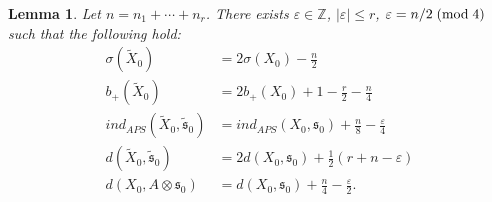 \documentclass{amsart}
\newtheorem{lemma}[theorem]{Lemma}
\theoremstyle{definition}
\theoremstyle{remark}
\numberwithin{equation}{section}
\begin{document}
\begin{lemma}\label{lem:rpcov}
Let $n = n_1 + \cdots + n_r$. There exists $\varepsilon \in \mathbb{Z}$, $| \varepsilon | \le r$, $\varepsilon = n/2 \; ({\rm mod} \; 4)$ such that the following hold:
\begin{align*}
\sigma(\widetilde{X}_0) &= 2 \sigma(X_0) - \frac{n}{2} \\
b_+(\widetilde{X}_0) &= 2b_+(X_0) + 1 -\frac{r}{2} - \frac{n}{4} \\
ind_{APS}(\widetilde{X}_0 , \widetilde{\mathfrak{s}}_0) &= ind_{APS}(X_0 , \mathfrak{s}_0) + \frac{n}{8} - \frac{\varepsilon}{4} \\
d(\widetilde{X}_0 , \widetilde{\mathfrak{s}}_0) &= 2d(X_0 , \mathfrak{s}_0) + \frac{1}{2}( r+n-\varepsilon) \\
d(X_0 , A \otimes \mathfrak{s}_0) &= d(X_0 , \mathfrak{s}_0) + \frac{n}{4} - \frac{\varepsilon}{2}.
\end{align*}

\end{lemma}
\end{document}
